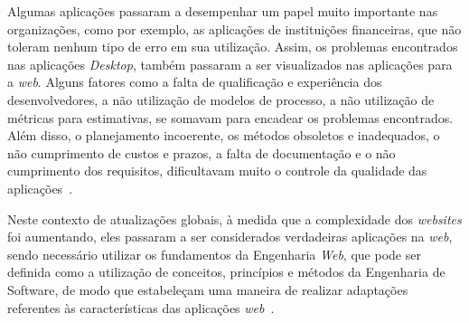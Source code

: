 Algumas aplicações passaram a desempenhar um papel muito importante nas organizações, como por exemplo, as aplicações de instituições financeiras, que não toleram nenhum tipo de erro em sua utilização. Assim, os problemas encontrados nas aplicações \textit{Desktop}, também passaram a ser visualizados nas aplicações para a \textit{web}. Alguns fatores como a falta de qualificação e experiência dos desenvolvedores, a não utilização de modelos de processo, a não utilização de métricas para estimativas, se somavam para encadear os problemas encontrados. Além disso, o planejamento incoerente, os métodos obsoletos e inadequados, o não cumprimento de custos e prazos, a falta de documentação e o não cumprimento dos requisitos, dificultavam muito o controle da qualidade das aplicações~\cite{peruch-pg07}.               

Neste contexto de atualizações globais, à medida que a complexidade dos \textit{websites} foi aumentando, eles passaram a ser considerados verdadeiras aplicações na \textit{web}, sendo necessário utilizar os fundamentos da Engenharia \textit{Web}, que pode ser definida como a utilização de conceitos, princípios e métodos da Engenharia de Software, de modo que estabeleçam uma maneira de realizar adaptações referentes às características das aplicações \textit{web}~\cite{beder:ew12}.         	







       
